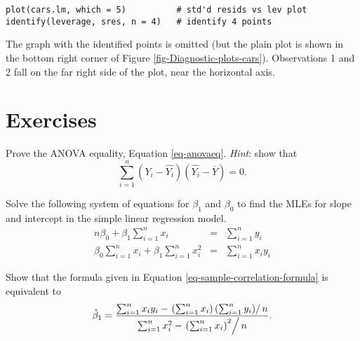 \begin{verbatim}
plot(cars.lm, which = 5)          # std'd resids vs lev plot
identify(leverage, sres, n = 4)   # identify 4 points
\end{verbatim}

The graph with the identified points is omitted (but the plain plot is
shown in the bottom right corner of Figure
\ref{fig-Diagnostic-plots-cars}). Observations 1 and 2 fall on the far right
side of the plot, near the horizontal axis.

\newpage{}

\section{Exercises}
\label{sec-11-6}
\setcounter{thm}{0}

\begin{xca}
Prove the ANOVA equality, Equation \eqref{eq-anovaeq}. \emph{Hint}:
show that
\[
\sum_{i=1}^{n}(Y_{i}-\hat{Y_{i}})(\hat{Y_{i}}-\overline{Y})=0.
\]
\end{xca}

\begin{xca}
\label{xca-find-mles-SLR} Solve the following system of equations for
\(\beta_{1}\) and \(\beta_{0}\) to find the MLEs for slope and
intercept in the simple linear regression model.
\begin{eqnarray*}
n\beta_{0}+\beta_{1}\sum_{i=1}^{n}x_{i} & = & \sum_{i=1}^{n}y_{i}\\
\beta_{0}\sum_{i=1}^{n}x_{i}+\beta_{1}\sum_{i=1}^{n}x_{i}^{2} & = & \sum_{i=1}^{n}x_{i}y_{i}
\end{eqnarray*}
\end{xca}

\begin{xca}
\label{xca-show-alternate-slope-formula} Show that the formula given in
Equation \eqref{eq-sample-correlation-formula} is equivalent to \[
\hat{\beta}_{1} =
\frac{\sum_{i=1}^{n}x_{i}y_{i}-\left.\left(\sum_{i=1}^{n}x_{i}\right)\left(\sum_{i=1}^{n}y_{i}\right)\right/
n}{\sum_{i=1}^{n}x_{i}^{2}-\left.\left(\sum_{i=1}^{n}x_{i}\right)^{2}\right/
n}.  \]
\end{xca}
